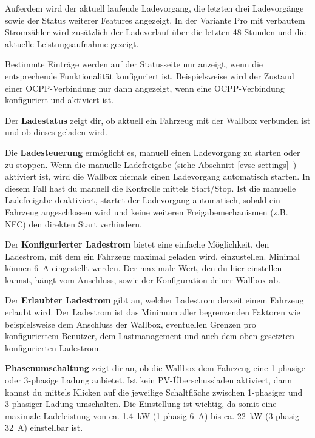 \documentclass[a4paper,10pt]{article}
\newcommand*{\fullref}[1]{Abschnitt \hyperref[{#1}]{\ref*{#1}~\nameref*{#1}}}
\begin{document}
\begin{multicols*}{2}
    Außerdem wird der aktuell laufende Ladevorgang, die letzten drei
    Ladevorgänge sowie der Status weiterer Features angezeigt.
    In der Variante Pro mit verbautem Stromzähler wird zusätzlich der Ladeverlauf
    über die letzten 48 Stunden und die aktuelle Leistungsaufnahme gezeigt.

    Bestimmte Einträge werden auf der Statusseite nur anzeigt, wenn die entsprechende
    Funktionalität konfiguriert ist. Beispielsweise wird der Zustand einer OCPP-Verbindung
    nur dann angezeigt, wenn eine OCPP-Verbindung konfiguriert und aktiviert ist.

    Der \textbf{Ladestatus} zeigt dir, ob aktuell ein
    Fahrzeug mit der Wallbox verbunden ist und ob dieses geladen wird.

    Die \textbf{Ladesteuerung} ermöglicht es, manuell einen Ladevorgang zu
    starten oder zu stoppen. Wenn die manuelle Ladefreigabe (siehe \fullref{evse-settings}) aktiviert ist, wird die
    Wallbox niemals einen Ladevorgang automatisch starten. In diesem Fall hast du
    manuell die Kontrolle mittels Start/Stop. Ist die manuelle Ladefreigabe deaktiviert,
    startet der Ladevorgang automatisch, sobald ein Fahrzeug
    angeschlossen wird und keine weiteren Freigabemechanismen (z.B. NFC) den
    direkten Start verhindern.

    Der \textbf{Konfigurierter Ladestrom} bietet eine einfache Möglichkeit, den
	Ladestrom, mit dem ein Fahrzeug maximal geladen wird, einzustellen. 
	Minimal können \SI{6}{\ampere} eingestellt werden. Der maximale Wert, den du
	hier einstellen kannst, hängt vom Anschluss, sowie der Konfiguration deiner Wallbox ab.

    Der \textbf{Erlaubter Ladestrom} gibt an, welcher Ladestrom derzeit einem Fahrzeug erlaubt
    wird. Der Ladestrom ist das Minimum aller begrenzenden Faktoren wie
    beispielsweise dem Anschluss der Wallbox, eventuellen Grenzen pro konfiguriertem Benutzer,
    dem Lastmanagement und auch dem oben gesetzten konfigurierten Ladestrom.

	\textbf{Phasenumschaltung} zeigt dir an, ob die Wallbox dem Fahrzeug eine
	1-phasige oder 3-phasige Ladung anbietet. Ist kein PV-Überschussladen
	aktiviert, dann kannst du mittels Klicken auf die jeweilige Schaltfläche
	zwischen 1-phasiger und 3-phasiger Ladung umschalten. Die Einstellung ist
	wichtig, da somit eine maximale Ladeleistung von ca. \SI{1,4}{\kilo\watt}
	(1-phasig \SI{6}{\ampere}) bis ca. \SI{22}{\kilo\watt}
	(3-phasig \SI{32}{\ampere}) einstellbar ist.


\end{multicols*}
\end{document}
